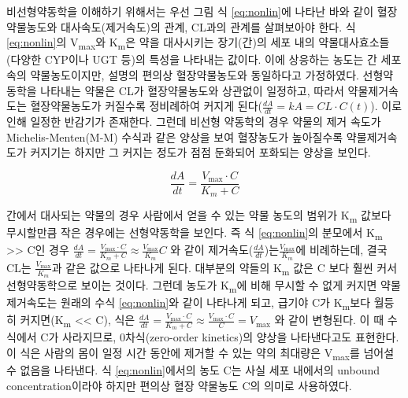 \documentclass[
  11pt,
  krantz2, a4paper, twoside]{krantz}
\theoremstyle{definition}
\theoremstyle{definition}
\theoremstyle{definition}
\theoremstyle{definition}
\theoremstyle{remark}
\begin{document}
비선형약동학을 이해하기 위해서는 우선 그림 식 \eqref{eq:nonlin}에 나타난 바와 같이 혈장 약물농도와 대사속도(제거속도)의 관계, CL과의 관계를 살펴보아야 한다. 
식 \eqref{eq:nonlin}의 V\textsubscript{max}와 K\textsubscript{m}은 약을 대사시키는 장기(간)의 세포 내의 약물대사효소들(다양한 CYP이나 UGT 등)의 특성을 나타내는 값이다.
이에 상응하는 농도는 간 세포 속의 약물농도이지만, 설명의 편의상 혈장약물농도와 동일하다고 가정하였다.
선형약동학을 나타내는 약물은 CL가 혈장약물농도와 상관없이 일정하고, 따라서 약물제거속도는 혈장약물농도가 커질수록 정비례하여 커지게 된다(\(\frac{{dA}}{{dt}} = kA = CL \cdot C(t)\)). 
이로 인해 일정한 반감기가 존재한다. 
그런데 비선형 약동학의 경우 약물의 제거 속도가 Michelis-Menten(M-M) 수식과 같은 양상을 보여 혈장농도가 높아질수록 약물제거속도가 커지기는 하지만 그 커지는 정도가 점점 둔화되어 포화되는 양상을 보인다. 

\begin{equation}
\frac{{dA}}{{dt}} = \frac{V_{\max} \cdot C}{K_{m} + C}
\label{eq:nonlin}
\end{equation}

간에서 대사되는 약물의 경우 사람에서 얻을 수 있는 약물 농도의 범위가 K\textsubscript{m} 값보다 무시할만큼 작은 경우에는 선형약동학을 보인다. 
즉 식 \eqref{eq:nonlin}의 분모에서 K\textsubscript{m} \textgreater\textgreater{} C인 경우 \(\frac{{dA}}{{dt}} = \frac{V_{\max} \cdot C}{K_{m} + C} \approx \frac{V_{\max}}{K_{m}}C\) 와 같이 제거속도(\(\frac{{dA}}{{dt}}\))는\(\frac{V_{\max}}{K_{m}}\)에 비례하는데, 결국 CL는 \(\frac{V_{\max}}{K_{m}}\)과 같은 값으로 나타나게 된다.
대부분의 약들의 K\textsubscript{m} 값은 C 보다 훨씬 커서 선형약동학으로 보이는 것이다. 
그런데 농도가 K\textsubscript{m}에 비해 무시할 수 없게 커지면 약물제거속도는 원래의 수식 \eqref{eq:nonlin}와 같이 나타나게 되고, 급기야 C가 K\textsubscript{m}보다 월등히 커지면(K\textsubscript{m} \textless\textless{} C), 식은 \(\frac{{dA}}{{dt}} = \frac{V_{\max} \cdot C}{K_{m} + C} \approx \frac{V_{\max} \cdot C}{C} = V_{\max}\) 와 같이 변형된다.
이 때 수식에서 C가 사라지므로, 0차식(zero-order kinetics)의 양상을 나타낸다고도 표현한다.
이 식은 사람의 몸이 일정 시간 동안에 제거할 수 있는 약의 최대량은 V\textsubscript{max}를 넘어설 수 없음을 나타낸다. 식 \eqref{eq:nonlin}에서의 농도 C는 사실 세포 내에서의 unbound concentration이라야 하지만 편의상 혈장 약물농도 C의 의미로 사용하였다.
\end{document}
